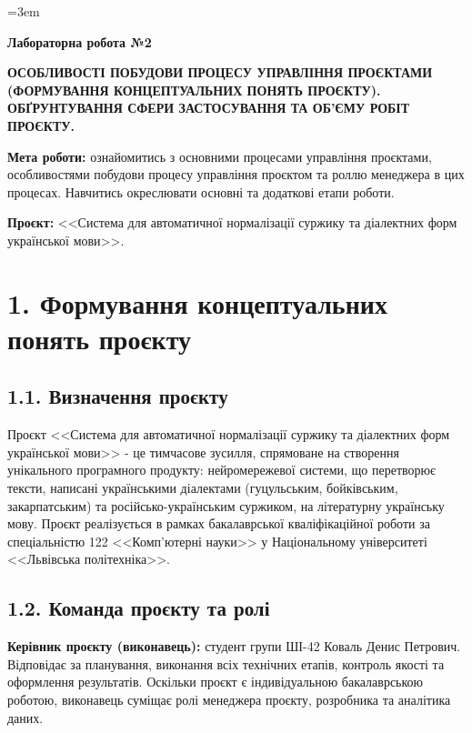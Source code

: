 \documentclass[14pt]{extarticle}
\begin{document}
\sloppy
\emergencystretch=3em

\begin{center}
\textbf{Лабораторна робота №2}

\medskip

\textbf{\MakeUppercase{Особливості побудови процесу управління проєктами (формування концептуальних понять проєкту). Обґрунтування сфери застосування та об'єму робіт проєкту.}}
\end{center}

\medskip

\textbf{Мета роботи:} ознайомитись з основними процесами управління проєктами, особливостями побудови процесу управління проєктом та роллю менеджера в цих процесах. Навчитись окреслювати основні та додаткові етапи роботи.

\textbf{Проєкт:} <<Система для автоматичної нормалізації суржику та діалектних форм української мови>>.

\section*{1. Формування концептуальних понять проєкту}

\subsection*{1.1. Визначення проєкту}

Проєкт <<Система для автоматичної нормалізації суржику та діалектних форм української мови>> - це тимчасове зусилля, спрямоване на створення унікального програмного продукту: нейромережевої системи, що перетворює тексти, написані українськими діалектами (гуцульським, бойківським, закарпатським) та російсько-українським суржиком, на літературну українську мову. Проєкт реалізується в рамках бакалаврської кваліфікаційної роботи за спеціальністю 122 <<Комп'ютерні науки>> у Національному університеті <<Львівська політехніка>>.

\subsection*{1.2. Команда проєкту та ролі}

\textbf{Керівник проєкту (виконавець):} студент групи ШІ-42 Коваль Денис Петрович. Відповідає за планування, виконання всіх технічних етапів, контроль якості та оформлення результатів. Оскільки проєкт є індивідуальною бакалаврською роботою, виконавець суміщає ролі менеджера проєкту, розробника та аналітика даних.
\end{document}
